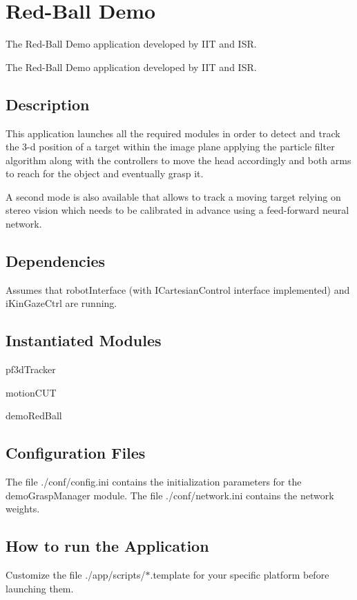\section{Red-\/\+Ball Demo}
\label{group__app__demoRedBall}


The Red-\/\+Ball Demo application developed by I\+IT and I\+SR.  


The Red-\/\+Ball Demo application developed by I\+IT and I\+SR. 

\hypertarget{group__src__demoYoga_intro_sec}{}\subsection{Description}\label{group__src__demoYoga_intro_sec}
This application launches all the required modules in order to detect and track the 3-\/d position of a target within the image plane applying the particle filter algorithm along with the controllers to move the head accordingly and both arms to reach for the object and eventually grasp it.

A second mode is also available that allows to track a moving target relying on stereo vision which needs to be calibrated in advance using a feed-\/forward neural network.\hypertarget{group__app__demoRedBall_dep_sec}{}\subsection{Dependencies}\label{group__app__demoRedBall_dep_sec}
Assumes that robot\+Interface (with I\+Cartesian\+Control interface implemented) and i\+Kin\+Gaze\+Ctrl are running.\hypertarget{group__app__demoRedBall_int_sec}{}\subsection{Instantiated Modules}\label{group__app__demoRedBall_int_sec}

\begin{DoxyItemize}
\item pf3d\+Tracker
\item motion\+C\+UT
\item demo\+Red\+Ball
\end{DoxyItemize}\hypertarget{group__app__demoRedBall_config_sec}{}\subsection{Configuration Files}\label{group__app__demoRedBall_config_sec}
The file ./conf/config.ini contains the initialization parameters for the demo\+Grasp\+Manager module. The file ./conf/network.ini contains the network weights.\hypertarget{group__app__demoRedBall_howto_sec}{}\subsection{How to run the Application}\label{group__app__demoRedBall_howto_sec}
Customize the file ./app/scripts/$\ast$.template for your specific platform before launching them.


